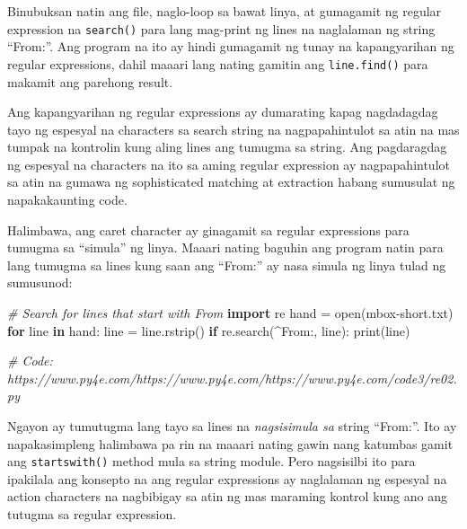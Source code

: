 \documentclass[10pt,]{book}
\newenvironment{Shaded}{}{}
\newcommand{\BuiltInTok}[1]{\textcolor[rgb]{0.00,0.50,0.00}{#1}}
\newcommand{\CommentTok}[1]{\textcolor[rgb]{0.38,0.63,0.69}{\textit{#1}}}
\newcommand{\ControlFlowTok}[1]{\textcolor[rgb]{0.00,0.44,0.13}{\textbf{#1}}}
\newcommand{\ImportTok}[1]{\textcolor[rgb]{0.00,0.50,0.00}{\textbf{#1}}}
\newcommand{\KeywordTok}[1]{\textcolor[rgb]{0.00,0.44,0.13}{\textbf{#1}}}
\newcommand{\NormalTok}[1]{#1}
\newcommand{\OperatorTok}[1]{\textcolor[rgb]{0.40,0.40,0.40}{#1}}
\newcommand{\StringTok}[1]{\textcolor[rgb]{0.25,0.44,0.63}{#1}}
\begin{document}
Binubuksan natin ang file, naglo-loop sa bawat linya, at gumagamit ng
regular expression na \texttt{search()} para lang mag-print ng lines na
naglalaman ng string ``From:''. Ang program na ito ay hindi gumagamit ng
tunay na kapangyarihan ng regular expressions, dahil maaari lang nating
gamitin ang \texttt{line.find()} para makamit ang parehong result.


Ang kapangyarihan ng regular expressions ay dumarating kapag nagdadagdag
tayo ng espesyal na characters sa search string na nagpapahintulot sa
atin na mas tumpak na kontrolin kung aling lines ang tumugma sa string.
Ang pagdaragdag ng espesyal na characters na ito sa aming regular
expression ay nagpapahintulot sa atin na gumawa ng sophisticated
matching at extraction habang sumusulat ng napakakaunting code.

Halimbawa, ang caret character ay ginagamit sa regular expressions para
tumugma sa ``simula'' ng linya. Maaari nating baguhin ang program natin
para lang tumugma sa lines kung saan ang ``From:'' ay nasa simula ng
linya tulad ng sumusunod:

\begin{Shaded}
\begin{Highlighting}[]
\CommentTok{\# Search for lines that start with \textquotesingle{}From\textquotesingle{}}
\ImportTok{import}\NormalTok{ re}
\NormalTok{hand }\OperatorTok{=} \BuiltInTok{open}\NormalTok{(}\StringTok{\textquotesingle{}mbox{-}short.txt\textquotesingle{}}\NormalTok{)}
\ControlFlowTok{for}\NormalTok{ line }\KeywordTok{in}\NormalTok{ hand:}
\NormalTok{    line }\OperatorTok{=}\NormalTok{ line.rstrip()}
    \ControlFlowTok{if}\NormalTok{ re.search(}\StringTok{\textquotesingle{}\^{}From:\textquotesingle{}}\NormalTok{, line):}
        \BuiltInTok{print}\NormalTok{(line)}

\CommentTok{\# Code: https://www.py4e.com/https://www.py4e.com/https://www.py4e.com/code3/re02.py}
\end{Highlighting}
\end{Shaded}


Ngayon ay tumutugma lang tayo sa lines na \emph{nagsisimula sa} string
``From:''. Ito ay napakasimpleng halimbawa pa rin na maaari nating gawin
nang katumbas gamit ang \texttt{startswith()} method mula sa string
module. Pero nagsisilbi ito para ipakilala ang konsepto na ang regular
expressions ay naglalaman ng espesyal na action characters na nagbibigay
sa atin ng mas maraming kontrol kung ano ang tutugma sa regular
expression.
\end{document}
